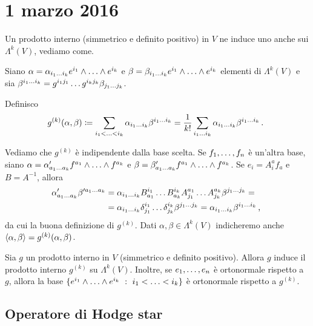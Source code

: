 \chapter{1 marzo 2016}

Un prodotto interno (simmetrico e definito positivo) in $V$ ne induce uno anche sui $\Lambda^k(V)$, vediamo come.

Siano $\alpha = \alpha_{\seqb ik{}} e^{i_1}\wedge\ldots\wedge e^{i_k}$ e $\beta = \beta_{\seqb ik{}} e^{i_1}\wedge\ldots\wedge e^{i_k}$ elementi di $\Lambda^k(V)$ e sia $\beta^{\seqb ik{}} = g^{i_1j_1}\ldots g^{i_kj_k} \beta_{\seqb jk{}}$.

Definisco
\begin{equation*}
	g^{(k)} (\alpha,\beta) \coloneqq \sum_{\seqb ik<} \alpha_{\seqb ik{}} \beta^{\seqb ik{}} 
	= \frac 1{k!} \sum_{\seqb ik{}} \alpha_{\seqb ik{}} \beta^{\seqb ik{}} \punto
\end{equation*}

Vediamo che $g^{(k)}$ è indipendente dalla base scelta.
Se $\seqb fn,$ è un'altra base, siano $\alpha = \alpha'_{\seqb ak{}} f^{a_1}\wedge\ldots\wedge f^{a_k}$ e $\beta = \beta'_{\seqb ak{}} f^{a_1}\wedge\ldots\wedge f^{a_k}$. Se $e_i =  A^a_i f_a$ e $B=A^{-1}$, allora
\begin{align*}
	\alpha'_{\seqb ak{}} \beta'^{\seqb ak{}} &= \alpha_{\seqb ik{}} B^{i_1}_{a_1}\ldots B^{i_k}_{a_k} A^{a_1}_{j_1}\ldots A^{a_k}_{j_k} \beta^{\seqb jk{}}= \\
	&= \alpha_{\seqb ik{}} \delta^{i_1}_{j_1}\ldots \delta^{i_k}_{j_k}\beta^{\seqb jk{}} =\alpha_{\seqb ik{}} \beta^{\seqb ik{}} \virgola
\end{align*}
da cui la buona definizione di $g^{(k)}$. Dati $\alpha,\beta \in \Lambda^k(V)$ indicheremo anche $\Scal\alpha\beta=g^{(k)}(\alpha,\beta)$.

\begin{proposition}
	Sia $g$ un prodotto interno in $V$ (simmetrico e definito positivo). Allora $g$ induce il prodotto interno $g^{(k)}$ su $\Lambda^k(V)$. Inoltre, se $\seqb en,$ è ortonormale rispetto a $g$, allora la base $\{e^{i_1}\wedge\ldots\wedge e^{i_k} \suchthat \seqb ik< \}$ è ortonormale rispetto a $g^{(k)}$.
\end{proposition}

\section{Operatore di Hodge star}

